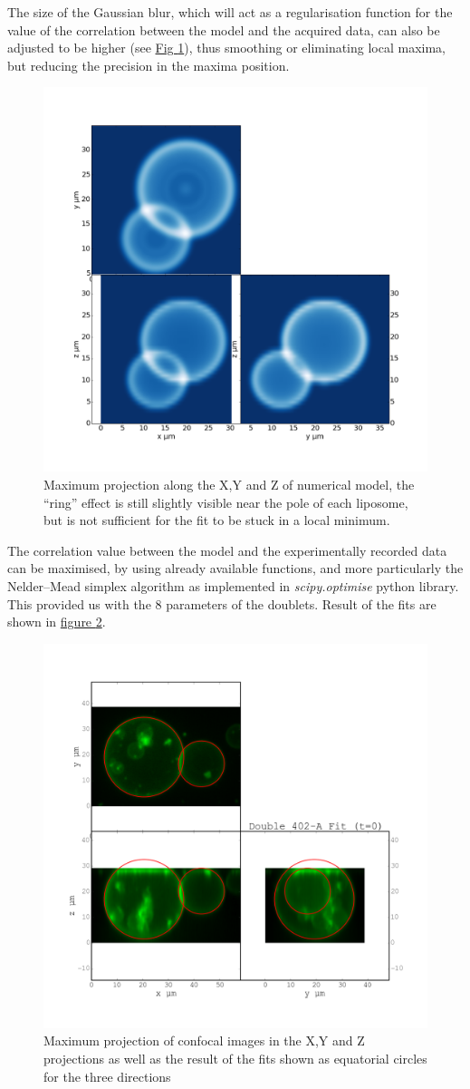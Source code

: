 \documentclass[A4paperpaper,11pt,english]{sphinxmanual}
\begin{document}
The size of the
Gaussian blur, which will act as a regularisation
function for the value of the correlation between the model and the acquired
data, can also be adjusted to be higher (see \hyperref[index-latex:max-proj-model]{Fig  \ref*{index-latex:max-proj-model}}), thus smoothing or eliminating local maxima,
but reducing the precision in the maxima position.
\begin{figure}[htbp]
\centering
\capstart

\includegraphics[width=0.500\linewidth]{max_proj_model.png}
\caption{Maximum projection along the X,Y and Z of numerical model, the ``ring'' effect
is still slightly visible near the pole of each liposome, but is not
sufficient for the fit to be stuck in a local minimum.}\label{index-latex:max-proj-model}\end{figure}

The correlation value between the model and the experimentally recorded
data can be maximised, by using already available functions, and more particularly the Nelder–Mead simplex algorithm as implemented in \emph{scipy.optimise} python library. This
provided us with the 8 parameters of the doublets. Result of the fits are shown in
\hyperref[index-latex:fig-fit-t0]{figure  \ref*{index-latex:fig-fit-t0}}.
\begin{figure}[htbp]
\centering
\capstart

\includegraphics[width=0.500\linewidth]{Doublet-402-A-Fit-t-0.png}
\caption{Maximum projection of confocal images in the X,Y and Z projections as well
as the result of the fits shown as equatorial circles for the three
directions}\label{index-latex:fig-fit-t0}\end{figure}
\end{document}
